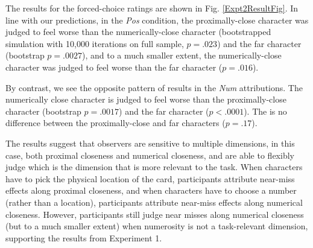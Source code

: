 \documentclass[10pt,letterpaper]{article}
\begin{document}

The results for the forced-choice ratings are shown in Fig. \ref{Expt2ResultFig}. In line with our predictions, in the \textit{Pos} condition, the proximally-close character was judged to feel worse than the numerically-close character (bootstrapped simulation with 10,000 iterations on full sample, $p=.023$) and the far character (bootstrap $p=.0027$), and to a much smaller extent, the numerically-close character was judged to feel worse than the far character ($p=.016$). 

By contrast, we see the opposite pattern of results in the \textit{Num} attributions. The numerically close character is judged to feel worse than the proximally-close character (bootstrap $p=.0017$) and the far character ($p<.0001$). The is no difference between the proximally-close and far characters ($p=.17$). %

The results suggest that observers are sensitive to multiple dimensions, in this case, both proximal closeness and numerical closeness, and are able to flexibly judge which is the dimension that is more relevant to the task. When characters have to pick the physical location of the card, participants attribute near-miss effects along proximal closeness, and when characters have to choose a number (rather than a location), participants attribute near-miss effects along numerical closeness. However, participants still judge near misses along numerical closeness (but to a much smaller extent) when numerosity is not a task-relevant dimension, supporting the results from Experiment 1. 
\end{document}
